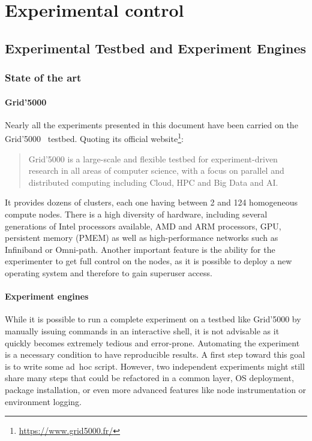 \part{Experimental control}
\label{part:experiment}

\chapter{Experimental Testbed and Experiment Engines}%
\label{chapter:experiment:testbed}

    \section{State of the art}%
    \label{sec:state_of_the_art}

        \subsection{Grid'5000}%
        \label{sub:grid_5000}

            Nearly all the experiments presented in this document have been carried on the Grid'5000~\cite{grid5000}
            testbed.  Quoting its official website\footnote{\url{https://www.grid5000.fr/}}: \blockquote{Grid'5000 is a
            large-scale and flexible testbed for experiment-driven research in all areas of computer science, with a
            focus on parallel and distributed computing including Cloud, HPC and Big Data and AI.} It provides dozens of
            clusters, each one having between 2 and 124 homogeneous compute nodes. There is a high diversity of hardware,
            including several generations of Intel processors available, AMD and ARM processors, GPU, persistent memory
            (PMEM) as well as high-performance networks such as Infiniband or Omni-path. Another important feature is the
            ability for the experimenter to get full control on the nodes, as it is possible to deploy a new operating
            system and therefore to gain superuser access.

        \subsection{Experiment engines}%
        \label{sub:experiment_engines}

            While it is possible to run a complete experiment on a testbed like Grid'5000 by manually issuing commands
            in an interactive shell, it is not advisable as it quickly becomes extremely tedious and error-prone.
            Automating the experiment is a necessary condition to have reproducible results. A first step toward this
            goal is to write some ad~hoc script. However, two independent experiments might still share many steps that
            could be refactored in a common layer, \eg OS deployment, package installation, or even more advanced
            features like node instrumentation or environment logging.

